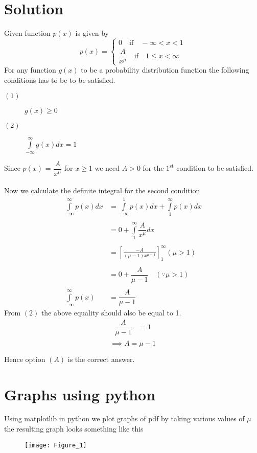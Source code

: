 \documentclass[journal,12pt,twocolumn]{IEEEtran}
\providecommand{\brak}[1]{\ensuremath{\left(#1\right)}}
\begin{document}
\section*{Solution}
Given function $p\brak{x}$ is given by
\begin{equation}
\nonumber p\brak{x}=
\begin{cases}
0 \quad \text{if}\quad -\infty<x<1\\
\dfrac{A}{x^\mu} \quad \text{if} \quad 1\leq x < \infty
\end{cases}
\end{equation}
For any function $g\brak{x}$ to be a probability distribution function the following conditions has to be to be satisfied.\\
\begin{description}
\item[$\brak{1}$] $g\brak{x} \geq 0$\\
\item[$\brak{2}$] $\int\limits_{-\infty}^{\infty}g\brak{x}dx = 1$
\end{description}
Since  $p\brak{x}$ = $\dfrac{A}{x^\mu}$ for $x\geq1$ we need $A>0$ for the $1^\text{st}$ condition to be satisfied.\\\\
Now we calculate the definite integral for the second condition
\begin{align}
\int\limits_{-\infty}^{\infty}p\brak{x}dx &=\int\limits_{-\infty}^{1}p\brak{x}dx + \int\limits_{1}^{\infty}p\brak{x}dx   \\\nonumber\\
 &= 0 + \int\limits_{1}^{\infty}\dfrac{A}{x^\mu}dx \;  \\\nonumber\\
  &= \left[\frac{-A}{\brak{\mu-1}x^{\mu-1}}\right]_{1}^{\infty}   \brak{ \mu > 1}\\\nonumber\\
  &= 0 + \dfrac{A}{\mu-1}  \quad \brak{\because \mu > 1}\\\nonumber\\
 \int\limits_{-\infty}^{\infty}p\brak{x} &= \dfrac{A}{\mu-1}
\end{align}
From $\brak{2}$ the above equality should also  be equal to 1. 
\begin{align}
 \dfrac{A}{\mu-1} &=1\\\nonumber
\end{align}
$$\implies A = \mu-1$$

Hence option $\brak{A}$ is the correct answer.
\newpage
\section*{Graphs using python}
Using  matplotlib in python we plot graphs of pdf by taking various values of $\mu$ the resulting graph looks something like this
\begin{figure}[h]
\texttt{[image: Figure\_1]}
\end{figure}
\end{document}
